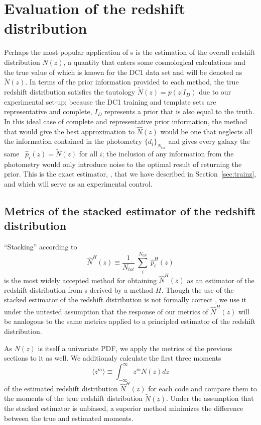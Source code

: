 \appendix

\section{Evaluation of the redshift distribution}
\label{sec:moments}

Perhaps the most popular application of \pzpdf s is the estimation of the overall redshift distribution $N(z)$, a quantity that enters some cosmological calculations and the true value of which is known for the DC1 data set and will be denoted as $\tilde{N}(z)$.
In terms of the prior information provided to each method, the true redshift distribution satisfies the tautology $\tilde{N}(z) = p(z \vert I_{D})$ due to our experimental set-up; because the DC1 training and template sets are representative and complete, $I_{D}$ represents a prior that is also equal to the truth.
In this ideal case of complete and representative prior information, the method that would give the best approximation to $\hat{N}(z)$ would be one that neglects all the information contained in the photometry $\{d_{i}\}_{N_{tot}}$ and gives every galaxy the same \pzpdf\ $\hat{p}_{i}(z) = \tilde{N}(z)$ for all $i$; the inclusion of any information from the photometry would only introduce noise to the optimal result of returning the prior.
This is the exact estimator, \trainz, that we have described in Section~\ref{sec:trainz}, and which will serve as an experimental control.

\subsection{Metrics of the stacked estimator of the redshift distribution}
\label{sec:stackedmetrics}

``Stacking'' according to
\begin{equation}
  \label{eq:stacked}
  \hat{N}^{H}(z) \equiv \frac{1}{N_{tot}}\ \sum_{i}^{N_{tot}}\ \hat{p}^{H}_{i}(z)
\end{equation}
is the most widely accepted method for obtaining $\hat{N}^{H}(z)$ as an estimator of the redshift distribution from \pzpdf s derived by a method $H$.
Though the use of the stacked estimator of the redshift distribution is not formally correct \citep{Malz:chippr}, we use it under the untested assumption that the response of our metrics of $\hat{N}^{H}(z)$ will be analogous to the same metrics applied to a principled estimator of the redshift distribution.

As $N(z)$ is itself a univariate PDF, we apply the metrics of the previous sections to it as well.
We additionaly calculate the first three moments
\begin{equation}
  \label{eq:moment}
  \langle z^{m}\rangle \equiv \int_{-\infty}^{\infty} z^{m} N(z) dz
\end{equation}
of the estimated redshift distribution $\hat{N}^{H}(z)$ for each code and compare them to the moments of the true redshift distribution $\tilde{N}(z)$.
Under the assumption that the stacked estimator is unbiased, a superior method minimizes the difference between the true and estimated moments.

